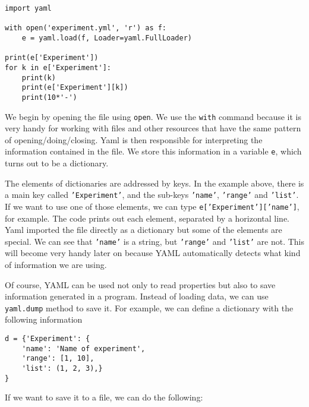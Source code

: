 \begin{verbatim}
import yaml

with open('experiment.yml', 'r') as f:
    e = yaml.load(f, Loader=yaml.FullLoader)

print(e['Experiment'])
for k in e['Experiment']:
    print(k)
    print(e['Experiment'][k])
    print(10*'-')
\end{verbatim}

We begin by opening the file using \texttt{open}. We use the \texttt{with} command because it is very handy for working with files and other resources that have the same pattern of opening/doing/closing. Yaml is then responsible for interpreting the information contained in the file. We store this information in a variable \texttt{e}, which turns out to be a dictionary.

The elements of dictionaries are addressed by keys. In the example above, there is a main key called \texttt{'Experiment'}, and the sub-keys \texttt{'name'}, \texttt{'range'} and \texttt{'list'}. If we want to use one of those elements, we can type \texttt{e['Experiment']['name']}, for example. The code prints out each element, separated by a horizontal line. Yaml imported the file directly as a dictionary but some of the elements are special. We can see that \texttt{'name'} is a string, but \texttt{'range'} and \texttt{'list'} are not. This will become very handy later on because YAML automatically detects what kind of information we are using.



Of course, YAML can be used not only to read properties but also to save information generated in a program. Instead of loading data, we can use \texttt{yaml.dump} method to save it. For example, we can define a dictionary with the following information

\begin{verbatim}
d = {'Experiment': {
    'name': 'Name of experiment',
    'range': [1, 10],
    'list': (1, 2, 3),}
}
\end{verbatim}

If we want to save it to a file, we can do the following:

